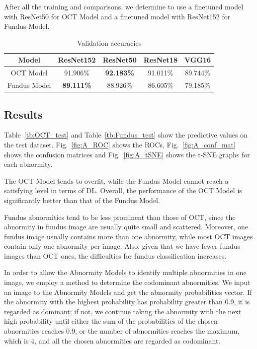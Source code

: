 \documentclass{article}
\begin{document}
	\vspace{0.2cm}
	
	After all the training and comparisons, we determine to use a finetuned model with ResNet50 for OCT Model and a finetuned model with ResNet152 for Fundus Model. 
	
	{
		\fontsize{9}{12}\selectfont
		{
			\begin{table}
				\centering
				\caption{Validation accuracies}
				\label{tb:A_accuracies}
				\begin{tabular}{ccccc}
					\toprule
					Model&ResNet152&ResNet50&ResNet18&VGG16\\
					\midrule
					OCT Model   &91.906\%&\textbf{92.183\%}&91.011\%&89.744\% \\
					Fundus Model&\textbf{89.111\%}&88.926\%&86.605\%&79.185\% \\
					\bottomrule
				\end{tabular}
			\end{table}
		}
	}
	
	\subsection{Results}
	
	Table~\ref{tb:OCT_test} and Table~\ref{tb:Fundus_test} show the predictive values on the test dataset. Fig.~\ref{fig:A_ROC} shows the ROCs, Fig.~\ref{fig:A_conf_mat} shows the confusion matrices and Fig.~\ref{fig:A_tSNE} shows the t-SNE graphs for each abnormity.
	
	The OCT Model tends to overfit, while the Fundus Model cannot reach a satisfying level in terms of DL. Overall, the performance of the OCT Model is significantly better than that of the Fundus Model.
	
	Fundus abnormities tend to be less prominent than those of OCT, since the abnormity in fundus image are usually quite small and scattered. Moreover, one fundus image usually contains more than one abnormity, while most OCT images contain only one abnormity per image. Also, given that we have fewer fundus images than OCT ones, the difficulties for fundus classification increases.
	
	In order to allow the Abnormity Models to identify multiple abnormities in one image, we employ a method to determine the codominant abnormities. We input an image to the Abnormity Models and get the abnormity probabilities vector. If the abnormity with the highest probability has probability greater than 0.9, it is regarded as dominant; if not, we continue taking the abnormity with the next high probability until either the sum of the probabilities of the chosen abnormities reaches 0.9, or the number of abnormities reaches the maximum, which is 4, and all the chosen abnormities are regarded as codominant. 
	
\end{document}
